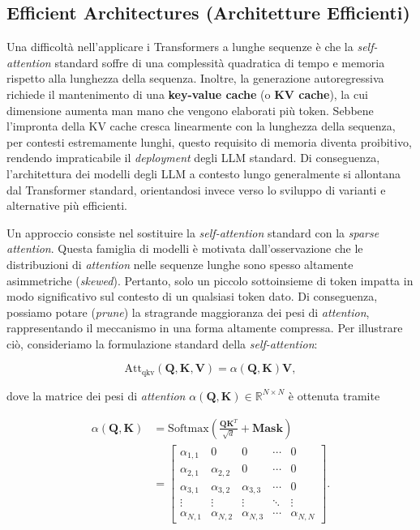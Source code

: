 \subsection{Efficient Architectures (Architetture Efficienti)}

Una difficoltà nell'applicare i Transformers a lunghe sequenze è che la \textit{self-attention} standard soffre di una complessità quadratica di tempo e memoria rispetto alla lunghezza della sequenza. Inoltre, la generazione autoregressiva richiede il mantenimento di una \textbf{key-value cache} (o \textbf{KV cache}), la cui dimensione aumenta man mano che vengono elaborati più token. Sebbene l'impronta della KV cache cresca linearmente con la lunghezza della sequenza, per contesti estremamente lunghi, questo requisito di memoria diventa proibitivo, rendendo impraticabile il \textit{deployment} degli LLM standard. Di conseguenza, l'architettura dei modelli degli LLM a contesto lungo generalmente si allontana dal Transformer standard, orientandosi invece verso lo sviluppo di varianti e alternative più efficienti.

Un approccio consiste nel sostituire la \textit{self-attention} standard con la \textit{sparse attention}. Questa famiglia di modelli è motivata dall'osservazione che le distribuzioni di \textit{attention} nelle sequenze lunghe sono spesso altamente asimmetriche (\textit{skewed}). Pertanto, solo un piccolo sottoinsieme di token impatta in modo significativo sul contesto di un qualsiasi token dato. Di conseguenza, possiamo potare (\textit{prune}) la stragrande maggioranza dei pesi di \textit{attention}, rappresentando il meccanismo in una forma altamente compressa. Per illustrare ciò, consideriamo la formulazione standard della \textit{self-attention}:

\begin{equation}
    \text{Att}_{\text{qkv}}(\mathbf{Q}, \mathbf{K}, \mathbf{V}) = \alpha(\mathbf{Q}, \mathbf{K})\mathbf{V},
\end{equation}

dove la matrice dei pesi di \textit{attention} $\alpha(\mathbf{Q}, \mathbf{K}) \in \mathbb{R}^{N \times N}$ è ottenuta tramite

\begin{align}
    \alpha(\mathbf{Q}, \mathbf{K}) &= \text{Softmax}\left(\frac{\mathbf{Q}\mathbf{K}^T}{\sqrt{d}} + \mathbf{Mask}\right) \nonumber \\
    &= \begin{bmatrix}
        \alpha_{1,1} & 0 & 0 & \cdots & 0 \\
        \alpha_{2,1} & \alpha_{2,2} & 0 & \cdots & 0 \\
        \alpha_{3,1} & \alpha_{3,2} & \alpha_{3,3} & \cdots & 0 \\
        \vdots & \vdots & \vdots & \ddots & \vdots \\
        \alpha_{N,1} & \alpha_{N,2} & \alpha_{N,3} & \cdots & \alpha_{N,N}
    \end{bmatrix}.
\end{align}

